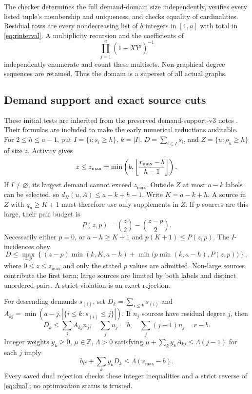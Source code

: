 \documentclass[11pt,a4paper]{article}
\begin{document}
The checker determines the full demand-domain size independently, verifies every listed tuple's membership and uniqueness, and checks equality of cardinalities. Residual rows are every nondecreasing list of $b$ integers in $[1,a]$ with total in \eqref{eq:rinterval}. A multiplicity recursion and the coefficients of
\[
 \prod_{j=1}^{a}(1-XY^j)^{-1}
\]
independently enumerate and count these multisets. Non-graphical degree sequences are retained. Thus the domain is a superset of all actual graphs.

\subsection{Demand support and exact source cuts}
These initial tests are inherited from the preserved demand-support-v3 notes \cite{v3}. Their formulas are included to make the early numerical reductions auditable.
For $2\le h\le a-1$, put $I=\{i:s_i\ge h\}$, $k=|I|$, $D=\sum_{i\in I}s_i$, and $Z=\{u:\rho_u\ge h\}$ of size $z$. Activity gives
\[
 z\le z_{\max}=\min\left(b,\left\lfloor\frac{r_{\max}-b}{h-1}\right\rfloor\right).
\]
If $I\ne\varnothing$, its largest demand cannot exceed $z_{\max}$. Outside $Z$ at most $a-k$ labels can be selected, so $d_H(u,A)\le a-k+h-1$. Write $K=a-k+h$. A source in $Z$ with $q_u\ge K+1$ must therefore use only supplements in $Z$. If $p$ sources are this large, their pair budget is
\[
 P(z,p)=\binom z2-\binom{z-p}2.
\]
Necessarily either $p=0$, or $a-h\ge K+1$ and $p(K+1)\le P(z,p)$. The $I$-incidences obey
\begin{equation}\label{eq:support}
D\le\max_{z,p}\left\{(z-p)\min(k,K,a-h)+\min\bigl(p\min(k,a-h),P(z,p)\bigr)\right\},
\end{equation}
where $0\le z\le z_{\max}$ and only the stated $p$ values are admitted. Non-large sources contribute the first term; large sources are limited by both labels and distinct unordered pairs. A strict violation is an exact rejection.

For descending demands $s_{(i)}$, set $D_k=\sum_{i\le k}s_{(i)}$ and
$A_{kj}=\min(a-j,|\{i\le k:s_{(i)}\le j\}|)$. If $n_j$ sources have residual degree $j$, then
\[
 D_k\le\sum_jA_{kj}n_j,\quad\sum_jn_j=b,\quad\sum_j(j-1)n_j=r-b.
\]
Integer weights $y_k\ge0$, $\mu\in\mathbb Z$, $\Lambda>0$ satisfying
$\mu+\sum_ky_kA_{kj}\le\Lambda(j-1)$ for each $j$ imply
\begin{equation}\label{eq:dual}
 b\mu+\sum_ky_kD_k\le\Lambda(r_{\max}-b).
\end{equation}
Every saved dual rejection checks these integer inequalities and a strict reverse of \eqref{eq:dual}; no optimisation status is trusted.
\end{document}
